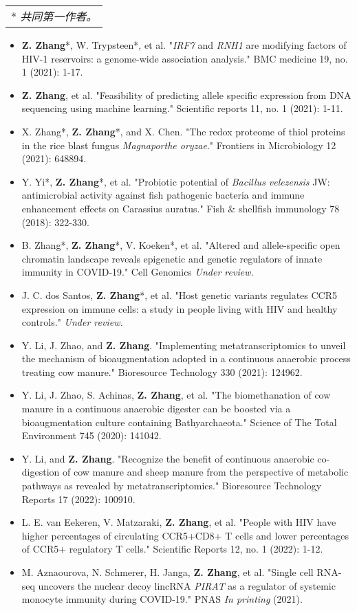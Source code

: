 \documentclass[8pt,A4]{article}
\newcommand{\mpwidth}{\linewidth-\fboxsep-\fboxsep}
\newcommand{\cvtextsmall}[1] {
	\begin{tabular*}{0.8\mpwidth}{p{0.8\mpwidth}}
		\parbox{0.8\mpwidth}{#1}
	\end{tabular*}
}
\begin{document}
\begin{paracol}{2}
\begin{rightcolumn}
\cvtextsmall{* \textit{共同第一作者。}}
\begin{itemize}[leftmargin=2em,itemsep=-2pt]
  \item \textbf{Z. Zhang}*, W. Trypsteen*, et al. "\textit{IRF7} and \textit{RNH1} are modifying factors of HIV-1 reservoirs: a genome-wide association analysis." BMC medicine 19, no. 1 (2021): 1-17.
  \item \textbf{Z. Zhang}, et al. "Feasibility of predicting allele specific expression from DNA sequencing using machine learning." Scientific reports 11, no. 1 (2021): 1-11.
  \item X. Zhang*, \textbf{Z. Zhang}*, and X. Chen. "The redox proteome of thiol proteins in the rice blast fungus \textit{Magnaporthe oryzae}." Frontiers in Microbiology 12 (2021): 648894.
  \item Y. Yi*, \textbf{Z. Zhang}*, et al. "Probiotic potential of \textit{Bacillus velezensis} JW: antimicrobial activity against fish pathogenic bacteria and immune enhancement effects on Carassius auratus." Fish \& shellfish immunology 78 (2018): 322-330.
  \item B. Zhang*, \textbf{Z. Zhang}*, V. Koeken*, et al. "Altered and allele-specific open chromatin landscape reveals epigenetic and genetic regulators of innate immunity in COVID-19." Cell Genomics \textit{Under review.}
  \item J. C. dos Santos, \textbf{Z. Zhang}*, et al. "Host genetic variants regulates CCR5 expression on immune cells: a study in people living with HIV and healthy controls." \textit{Under review.}
  \item Y. Li, J. Zhao, and \textbf{Z. Zhang}. "Implementing metatranscriptomics to unveil the mechanism of bioaugmentation adopted in a continuous anaerobic process treating cow manure." Bioresource Technology 330 (2021): 124962.
  \item Y. Li, J. Zhao, S. Achinas, \textbf{Z. Zhang}, et al. "The biomethanation of cow manure in a continuous anaerobic digester can be boosted via a bioaugmentation culture containing Bathyarchaeota." Science of The Total Environment 745 (2020): 141042.
  \item Y. Li, and \textbf{Z. Zhang}. "Recognize the benefit of continuous anaerobic co-digestion of cow manure and sheep manure from the perspective of metabolic pathways as revealed by metatranscriptomics." Bioresource Technology Reports 17 (2022): 100910.
  \item L. E. van Eekeren, V. Matzaraki, \textbf{Z. Zhang}, et al. "People with HIV have higher percentages of circulating CCR5+CD8+ T cells and lower percentages of CCR5+ regulatory T cells." Scientific Reports 12, no. 1 (2022): 1-12.
  \item M. Aznaourova, N. Schmerer, H. Janga, \textbf{Z. Zhang}, et al. "Single cell RNA-seq uncovers the nuclear decoy lincRNA \textit{PIRAT} as a regulator of systemic monocyte immunity during COVID-19." PNAS \textit{In printing} (2021).
\end{itemize}



\end{rightcolumn}
\end{paracol}
\end{document}
